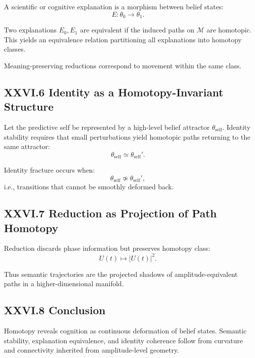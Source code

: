 \documentclass[11pt,letterpaper]{article}
\begin{document}
A scientific or cognitive explanation is a morphism between belief states:
\[
E : \theta_0 \to \theta_1.
\]

Two explanations $E_0, E_1$ are equivalent if the induced paths on $\mathcal{M}$ are homotopic. This yields an equivalence relation partitioning all explanations into homotopy classes.

Meaning-preserving reductions correspond to movement within the same class.

\subsection{XXVI.6 Identity as a Homotopy-Invariant Structure}

Let the predictive self be represented by a high-level belief attractor $\theta_{\text{self}}$. Identity stability requires that small perturbations yield homotopic paths returning to the same attractor:
\[
\theta_{\text{self}} \simeq \theta_{\text{self}}'.
\]

Identity fracture occurs when:
\[
\theta_{\text{self}} \not\simeq \theta_{\text{self}}',
\]
i.e., transitions that cannot be smoothly deformed back.

\subsection{XXVI.7 Reduction as Projection of Path Homotopy}

Reduction discards phase information but preserves homotopy class:
\[
U(t) \mapsto |U(t)|^2.
\]

Thus semantic trajectories are the projected shadows of amplitude-equivalent paths in a higher-dimensional manifold.

\subsection{XXVI.8 Conclusion}

Homotopy reveals cognition as continuous deformation of belief states. Semantic stability, explanation equivalence, and identity coherence follow from curvature and connectivity inherited from amplitude-level geometry.
\end{document}
